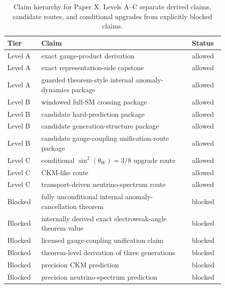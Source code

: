 \begin{table}[ht]
\centering
\small
\begin{tabular}{p{0.14\linewidth}p{0.62\linewidth}p{0.12\linewidth}}
\toprule
Tier & Claim & Status \\
\midrule
Level A & exact gauge-product derivation & allowed \\
Level A & exact representation-side capstone & allowed \\
Level A & guarded theorem-style internal anomaly-dynamics package & allowed \\
Level B & windowed full-SM crossing package & allowed \\
Level B & candidate hard-prediction package & allowed \\
Level B & candidate generation-structure package & allowed \\
Level B & candidate gauge-coupling unification-route package & allowed \\
Level C & conditional $\sin^2(\theta_W)=3/8$ upgrade route & allowed \\
Level C & CKM-like route & allowed \\
Level C & transport-driven neutrino-spectrum route & allowed \\
Blocked & fully unconditional internal anomaly-cancellation theorem & blocked \\
Blocked & internally derived exact electroweak-angle theorem value & blocked \\
Blocked & licensed gauge-coupling unification claim & blocked \\
Blocked & theorem-level derivation of three generations & blocked \\
Blocked & precision CKM prediction & blocked \\
Blocked & precision neutrino-spectrum prediction & blocked \\
\bottomrule
\end{tabular}
\caption{Claim hierarchy for Paper X. Levels A--C separate derived claims, candidate routes, and conditional upgrades from explicitly blocked claims.}
\label{tab:claim-hierarchy}
\end{table}
